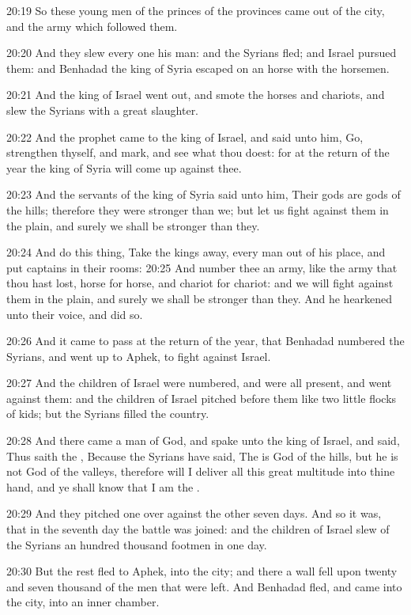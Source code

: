 20:19 So these young men of the princes of the provinces came out of the city, and the army which followed them.

20:20 And they slew every one his man: and the Syrians fled; and Israel pursued them: and Benhadad the king of Syria escaped on an horse with the horsemen.

20:21 And the king of Israel went out, and smote the horses and chariots, and slew the Syrians with a great slaughter.

20:22 And the prophet came to the king of Israel, and said unto him, Go, strengthen thyself, and mark, and see what thou doest: for at the return of the year the king of Syria will come up against thee.

20:23 And the servants of the king of Syria said unto him, Their gods are gods of the hills; therefore they were stronger than we; but let us fight against them in the plain, and surely we shall be stronger than they.

20:24 And do this thing, Take the kings away, every man out of his place, and put captains in their rooms: 20:25 And number thee an army, like the army that thou hast lost, horse for horse, and chariot for chariot: and we will fight against them in the plain, and surely we shall be stronger than they. And he hearkened unto their voice, and did so.

20:26 And it came to pass at the return of the year, that Benhadad numbered the Syrians, and went up to Aphek, to fight against Israel.

20:27 And the children of Israel were numbered, and were all present, and went against them: and the children of Israel pitched before them like two little flocks of kids; but the Syrians filled the country.

20:28 And there came a man of God, and spake unto the king of Israel, and said, Thus saith the \LORD, Because the Syrians have said, The \LORD is God of the hills, but he is not God of the valleys, therefore will I deliver all this great multitude into thine hand, and ye shall know that I am the \LORD.

20:29 And they pitched one over against the other seven days. And so it was, that in the seventh day the battle was joined: and the children of Israel slew of the Syrians an hundred thousand footmen in one day.

20:30 But the rest fled to Aphek, into the city; and there a wall fell upon twenty and seven thousand of the men that were left. And Benhadad fled, and came into the city, into an inner chamber.

